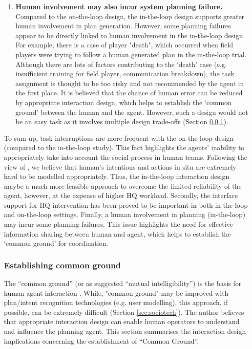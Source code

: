 \begin{enumerate}
\item \textbf{Human involvement may also incur system planning failure.} \\
Compared to the on-the-loop design, the in-the-loop design supports greater human involvement in plan generation. However, some planning failures appear to be directly linked to human involvement in the in-the-loop design. For example, there is a case of  player "death", which occurred  when field players were trying to follow a human generated plan in the in-the-loop trial.  Although there are lots of factors contributing to the `death' case (e.g. insufficient training for field player, communication breakdown), the task assignment is thought to be too risky and not recommended by the agent in the first place. It is believed that the chance of human error can be reduced by appropriate interaction design, which helps to establish the `common ground' between the human and the agent. However, such a design would not be an easy task as it involves multiple design trade-offs  (Section \ref{sec:conclusionCG}).
\end{enumerate}

To sum up, task interruptions are more frequent with the on-the-loop design (compared to the in-the-loop study). This fact highlights the agents' inability to appropriately take into account the social process in human teams. Following the view of \cite{Suchman1987}, we believe that human's intentions and actions in situ are extremely hard to be modelled appropriately. Thus, the in-the-loop interaction design maybe  a much more feasible approach to overcome the limited reliability of the agent, however, at the expense of higher HQ workload. Secondly, the interface support for HQ intervention has been proved to be important in both in-the-loop and on-the-loop settings. Finally, a human involvement in planning (in-the-loop) may incur some planning failures. This issue highlights the need for effective information sharing between human and agent, which helps to establish the `common ground' for coordination. \\


\subsubsection{Establishing common ground} \label{sec:conclusionCG}
The ``common ground'' (or as \cite{Suchman1987} suggested ``mutual intelligibility'') is the basis for human agent interaction \citep{Bradshaw2011}.  While, "common ground" may be improved with plan/intent recognition technologies (e.g. user modelling), this approach, if possible, can be extremely difficult (Section \ref{sec:sociotech}). The author believes that appropriate interaction design can enable human operators to understand and influence the planning agent. This section summarises the interaction design implications concerning the establishment of  ``Common Ground''.\\

